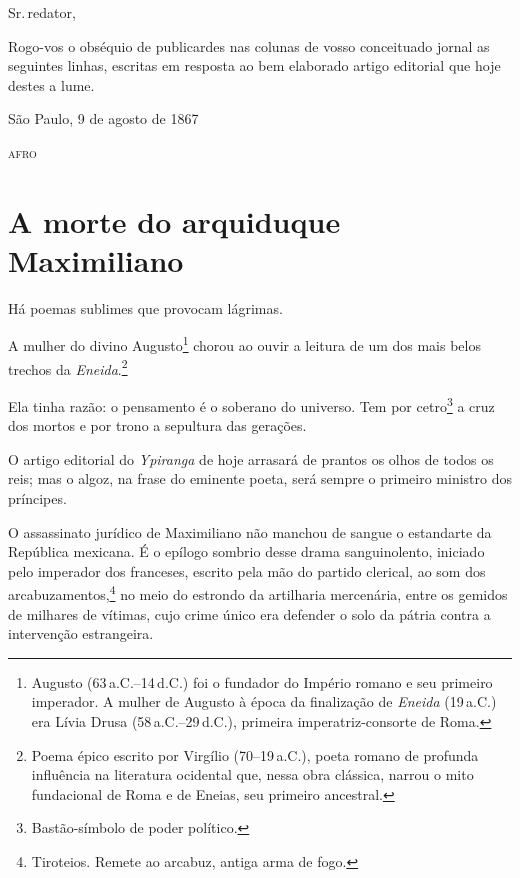 Sr.\,redator,

Rogo-vos o obséquio de publicardes nas colunas de vosso conceituado
jornal as seguintes linhas, escritas em resposta ao bem elaborado artigo
editorial que hoje destes a lume.

\begin{flushright}
São Paulo, 9 de agosto de 1867

\textsc{afro}
\end{flushright}

\section{A morte do arquiduque Maximiliano\protect\footnotemark}


Há poemas sublimes que provocam lágrimas.

A mulher do divino Augusto\footnote{Augusto (63\,a.C.--14\,d.C.) foi o
  fundador do Império romano e seu primeiro imperador. A mulher de
  Augusto à época da finalização de \emph{Eneida} (19\,a.C.) era Lívia
  Drusa (58\,a.C.--29\,d.C.), primeira imperatriz-consorte de Roma.} chorou
ao ouvir a leitura de um dos mais belos trechos da \textit{Eneida}.\footnote{
  Poema épico escrito por Virgílio (70--19\,a.C.), poeta romano de
  profunda influência na literatura ocidental que, nessa obra clássica,
  narrou o mito fundacional de Roma e de Eneias, seu primeiro ancestral.}

Ela tinha razão: o pensamento é o soberano do universo. Tem por
cetro\footnote{Bastão-símbolo de poder político.} a cruz dos mortos e
por trono a sepultura das gerações.

O artigo editorial do \emph{Ypiranga} de hoje arrasará de prantos os
olhos de todos os reis; mas o algoz, na frase do eminente poeta, será
sempre o primeiro ministro dos príncipes.

O assassinato jurídico de Maximiliano não manchou de sangue o estandarte
da República mexicana. É o epílogo sombrio desse drama sanguinolento,
iniciado pelo imperador dos franceses, escrito pela mão do partido
clerical, ao som dos arcabuzamentos,\footnote{Tiroteios. Remete ao
  arcabuz, antiga arma de fogo.} no meio do estrondo da artilharia
mercenária, entre os gemidos de milhares de vítimas, cujo crime único
era defender o solo da pátria contra a intervenção estrangeira.

